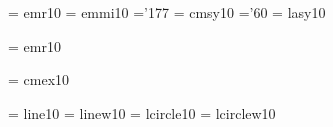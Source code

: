  \font\twtyrm  = emr10     %
 \font\twtymi  = emmi10    %
    \skewchar\twtymi ='177          %
 \font\twtysy  = cmsy10    %
    \skewchar\twtysy ='60           %
 \font\twtyly  = lasy10   %
 
 \font\twfvrm  = emr10     %
 
 \font\tenex   = cmex10
 
\font\tenln    = line10
\font\tenlnw   = linew10
\font\tencirc  = lcircle10    %
\font\tencircw = lcirclew10   %
 

